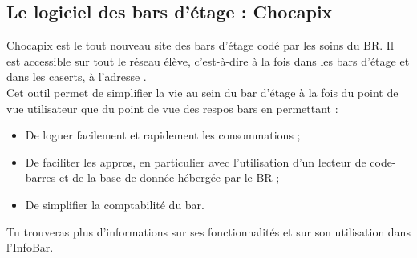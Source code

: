 \subsection{Le logiciel des bars d'étage : Chocapix}
\label{chocapix}

Chocapix est le tout nouveau site des bars d'étage codé par les soins du BR. Il est accessible sur tout le réseau élève, c'est-à-dire à la fois dans les bars d'étage et dans les caserts, à l'adresse .\\
Cet outil permet de simplifier la vie au sein du bar d'étage à la fois du point de vue utilisateur que du point de vue des respos bars en permettant :
\begin{itemize}
\item De loguer facilement et rapidement les consommations ;
\item De faciliter les appros, en particulier avec l'utilisation d'un lecteur de code-barres et de la base de donnée hébergée par le BR ;
\item De simplifier la comptabilité du bar.\\
\end{itemize}
Tu trouveras plus d'informations sur ses fonctionnalités et sur son utilisation dans l'InfoBar.
